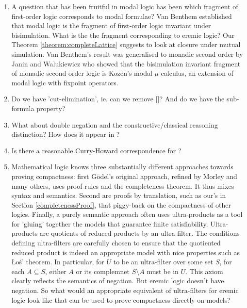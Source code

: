 \begin{enumerate}

\item A question that has been fruitful in modal logic has been which
  fragment of first-order logic corresponds to modal formulae?  Van
  Benthem established that modal logic is the fragment of first-order
  logic invariant under bisimulation. What is the the fragment
  corresponding to eremic logic? Our Theorem
  \ref{theorem:completeLattice} suggests to look at closure under
  mutual simulation. Van Benthem's result was generalised to monadic
  second order by Janin and Walukiewicz
  \cite{JaninD:expcomotpmcwrtmsol} who showed that the bisimulation
  invariant fragment of monadic second-order logic is Kozen's modal
  $\mu$-calculus, an extension of modal logic with fixpoint operators.

\item Do we have 'cut-elimination', ie. can we remove
  []?  And do we have the sub-formula property?

\item What about double negation and the constructive/classical
  reasoning distinction?  How does it appear in \ELABR{}?

\item Is there a reasonable Curry-Howard correspondence for \ELFULL{}?

\item Mathematical logic knows three substantially different
  approaches towards proving compactness: first G\"odel's original
  approach, refined by Morley and many others, uses proof rules and
  the completeness theorem. It thus mixes syntax and semantics. Second
  are proofs by translation, such as our's in Section
  \ref{completenessProof}, that piggy-back on the compactness of other
  logics. Finally, a purely semantic approach often uses
  ultra-products as a tool for 'gluing' together the models that
  guarantee finite satisfiability. Ultra-products are quotients of
  reduced products by an ultra-filter. The conditions defining
  ultra-filters are carefully chosen to ensure that the quotiented
  reduced product is indeed an appropriate model with nice properties
  such as \L{}o\'{s}' theorem. In particular, for $U$ to be an
  ultra-filter over some set $S$, for each $A \subseteq S$, either $A$
  or its complemnet $S\setminus A$ must be in $U$. This axiom clearly
  reflects the semantics of negation. But eremic logic doesn't have
  negation. So what would an appropriate equivalent of ultra-filters
  for eremic logic look like that can be used to prove compactness
  directly on models?


\end{enumerate}

